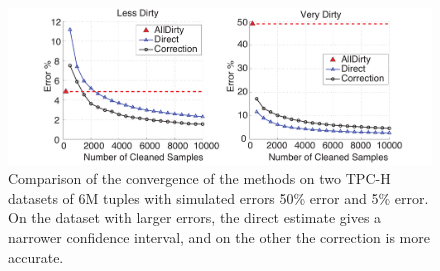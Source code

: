 \begin{figure}
\includegraphics[width=.6\columnwidth]{figs/allerror-samplesize.pdf}
\caption{Comparison of the convergence of the methods on two TPC-H datasets of 6M tuples with simulated errors 50\% error and 5\% error. On the dataset with larger errors, the direct estimate gives a narrower confidence interval, and on the other the correction is more accurate. \label{fig:est2}}
\end{figure}
\fi



